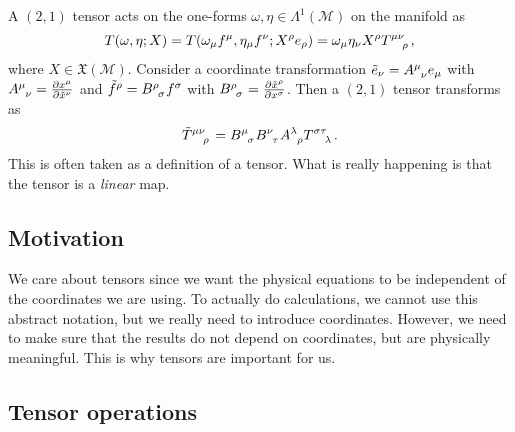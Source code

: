 \begin{example}[]
  A $(2,1)$ tensor acts on the one-forms $\omega, \eta \in \Lambda^1(\mathcal{M})$ on the manifold as
  \begin{equation}
    T(\omega, \eta; X) = T(\omega_\mu f^\mu, \eta_\mu f^\nu; X^\rho e_\rho) = \omega_\mu \eta_\nu X^\rho T \indices{^\mu ^\nu _\rho},
  \end{equation}
  where $X \in \mathfrak{X}(\mathcal{M})$. 
  Consider a coordinate transformation $\tilde e_\nu = A \indices{^\mu _\nu} e_\mu$ with $A \indices{^\mu _\nu} = \pdv{x^\mu}{ \tilde x^\nu}$ and $\tilde f^\rho = B \indices{ ^\rho _\sigma} f^\sigma$ with $B \indices{ ^\rho _\sigma} = \pdv{\tilde x ^\rho}{x^\sigma}$.
  Then a $(2, 1)$ tensor transforms as
  \begin{equation}
    \tilde T \indices{ ^\mu^\nu_\rho} = B \indices{^\mu_\sigma} B \indices{^\nu_\tau} A \indices{^\lambda_\rho} T \indices{^\sigma^\tau_\lambda}.
  \end{equation} 
  This is often taken as a definition of a tensor.
  What is really happening is that the tensor is a \emph{linear} map.
\end{example}

\subsection*{Motivation}%
\label{sub:motivation}

We care about tensors since we want the physical equations to be independent of the coordinates we are using.
To actually do calculations, we cannot use this abstract notation, but we really need to introduce coordinates.
However, we need to make sure that the results do not depend on coordinates, but are physically meaningful. This is why tensors are important for us.

\subsection{Tensor operations}%
\label{sub:tensor_operations}

